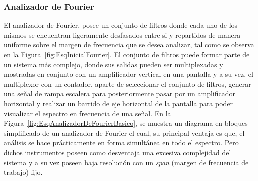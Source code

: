\subsubsection{Analizador de Fourier }
    
    El analizador de Fourier, posee un conjunto de filtros donde cada uno de los 
    mismos se encuentran ligeramente desfasados entre si y repartidos de manera 
    uniforme sobre el margen de frecuencia que se desea analizar, tal como se observa
    en la Figura~\ref{fig:EsqInicialFourier}. El conjunto de filtros puede formar 
    parte de un sistema más complejo, donde sus salidas pueden ser multiplexadas 
    y mostradas en conjunto con un amplificador vertical en una pantalla y a su vez, 
    el multiplexor con un contador, aparte de seleccionar el conjunto de filtros, 
    generar una señal de rampa escalera para posteriormente pasar por un 
    amplificador horizontal y realizar un barrido de eje horizontal de la pantalla 
    para poder visualizar el espectro en frecuencia de una señal. En la 
    Figura~\ref{fig:EsqAnalizadorDeFourierBasico}, se muestra un diagrama en bloques 
    simplificado de un analizador de Fourier el cual, su principal 
    ventaja es que, el análisis se hace prácticamente en forma simultánea en todo 
    el espectro. Pero dichos instrumentos poseen como desventaja una excesiva 
    complejidad del sistema y a su vez poseen baja resolución con un \textit{span} 
    (margen de frecuencia de trabajo) fijo.
